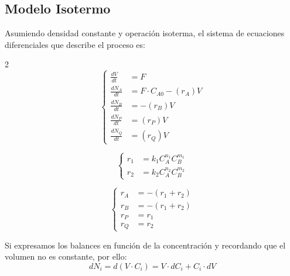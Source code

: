 \subsection{Modelo Isotermo}
\noindent Asumiendo densidad constante y operación isoterma, el sistema de ecuaciones diferenciales que describe el proceso es:
\begin{multicols}{2}
  \begin{equation*}
    \left\{
    \begin{aligned}
      \frac{dV}{dt}   & = F                        \\[6pt]
      \frac{dN_A}{dt} & = F \cdot C_{A0} - (r_A) V \\[6pt]
      \frac{dN_B}{dt} & = - (r_B) V                \\[6pt]
      \frac{dN_P}{dt} & = (r_P) V                  \\[6pt]
      \frac{dN_Q}{dt} & = (r_Q) V
    \end{aligned}
    \right.
  \end{equation*}

  \columnbreak

  \begin{equation*}
    \left\{
    \begin{aligned}
      r_1 & = k_1 C_A^{n_1} C_B^{m_1} \\[6pt]
      r_2 & = k_2 C_A^{n_2} C_B^{m_2}
    \end{aligned}
    \right.
  \end{equation*}

  \vspace{10pt} %

  \begin{equation*}
    \left\{
    \begin{aligned}
      r_A & = -(r_1 + r_2) \\[6pt]
      r_B & = -(r_1 + r_2) \\[6pt]
      r_P & = r_1          \\[6pt]
      r_Q & = r_2
    \end{aligned}
    \right.
  \end{equation*}
\end{multicols}
\noindent Si expresamos los balances en función de la concentración y recordando que el volumen no es constante, por ello:
\begin{equation}
  dN_i = d(V \cdot C_i) = V \cdot dC_i + C_i \cdot dV
\end{equation}
